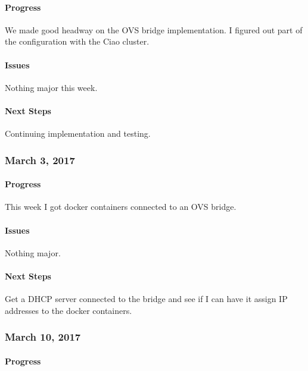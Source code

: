 \documentclass[10pt,onecolumn,journal,draftclsnofoot]{IEEEtran}
\begin{document}
\paragraph{Progress} 

We made good headway on the OVS bridge implementation. I figured out
part of the configuration with the Ciao cluster.

\paragraph{Issues} 

Nothing major this week.

\paragraph{Next Steps} 

Continuing implementation and testing.

\subsubsection{March 3, 2017} 

\paragraph{Progress} 

This week I got docker containers connected to an OVS bridge.

\paragraph{Issues} 

Nothing major.

\paragraph{Next Steps} 

Get a DHCP server connected to the bridge and see if I can have it
assign IP addresses to the docker containers.

\subsubsection{March 10, 2017} 

\paragraph{Progress} 
\end{document}

